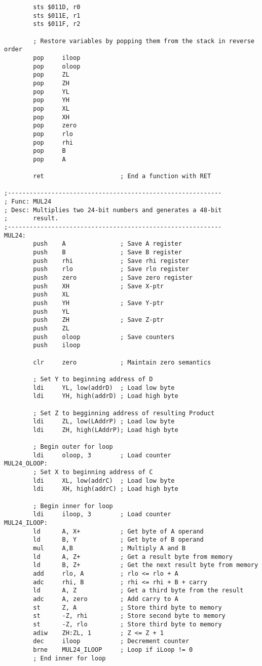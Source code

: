 \documentclass[12pt,letterpaper]{article}
\begin{document}
\begin{verbatim}
        sts $011D, r0
        sts $011E, r1
        sts $011F, r2
        
        ; Restore variables by popping them from the stack in reverse order
        pop     iloop
        pop     oloop
        pop     ZL              
        pop     ZH
        pop     YL
        pop     YH
        pop     XL
        pop     XH
        pop     zero
        pop     rlo
        pop     rhi
        pop     B
        pop     A

        ret                     ; End a function with RET

;-----------------------------------------------------------
; Func: MUL24
; Desc: Multiplies two 24-bit numbers and generates a 48-bit 
;       result.
;-----------------------------------------------------------
MUL24:
        push    A               ; Save A register
        push    B               ; Save B register
        push    rhi             ; Save rhi register
        push    rlo             ; Save rlo register
        push    zero            ; Save zero register
        push    XH              ; Save X-ptr
        push    XL
        push    YH              ; Save Y-ptr
        push    YL              
        push    ZH              ; Save Z-ptr
        push    ZL
        push    oloop           ; Save counters
        push    iloop               

        clr     zero            ; Maintain zero semantics

        ; Set Y to beginning address of D
        ldi     YL, low(addrD)  ; Load low byte
        ldi     YH, high(addrD) ; Load high byte

        ; Set Z to begginning address of resulting Product
        ldi     ZL, low(LAddrP) ; Load low byte
        ldi     ZH, high(LAddrP); Load high byte

        ; Begin outer for loop
        ldi     oloop, 3        ; Load counter
MUL24_OLOOP:
        ; Set X to beginning address of C
        ldi     XL, low(addrC)  ; Load low byte
        ldi     XH, high(addrC) ; Load high byte

        ; Begin inner for loop
        ldi     iloop, 3        ; Load counter
MUL24_ILOOP:
        ld      A, X+           ; Get byte of A operand
        ld      B, Y            ; Get byte of B operand
        mul     A,B             ; Multiply A and B
        ld      A, Z+           ; Get a result byte from memory
        ld      B, Z+           ; Get the next result byte from memory
        add     rlo, A          ; rlo <= rlo + A
        adc     rhi, B          ; rhi <= rhi + B + carry
        ld      A, Z            ; Get a third byte from the result
        adc     A, zero         ; Add carry to A
        st      Z, A            ; Store third byte to memory
        st      -Z, rhi         ; Store second byte to memory
        st      -Z, rlo         ; Store third byte to memory
        adiw    ZH:ZL, 1        ; Z <= Z + 1            
        dec     iloop           ; Decrement counter
        brne    MUL24_ILOOP     ; Loop if iLoop != 0
        ; End inner for loop


\end{verbatim}
\end{document}
